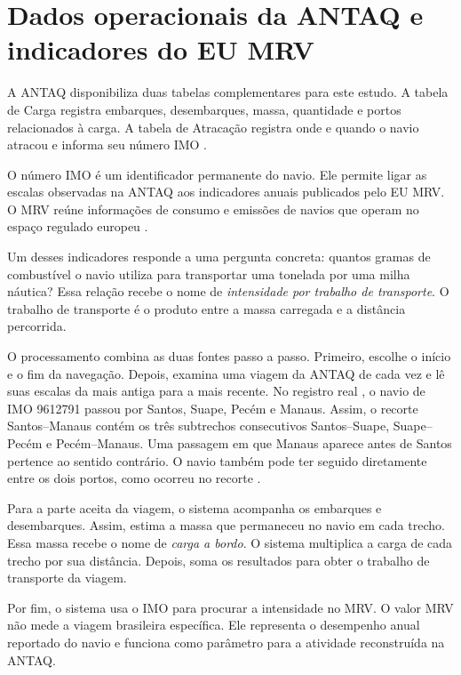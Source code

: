 \section{Dados operacionais da ANTAQ e indicadores do EU MRV}
\label{sec:antaq-mrv-literatura}

A ANTAQ disponibiliza duas tabelas complementares para este estudo. A tabela de Carga registra embarques, desembarques, massa, quantidade e portos relacionados à carga. A tabela de Atracação registra onde e quando o navio atracou e informa seu número IMO \cite{antaq2025}.

O número IMO é um identificador permanente do navio. Ele permite ligar as escalas observadas na ANTAQ aos indicadores anuais publicados pelo EU MRV. O MRV reúne informações de consumo e emissões de navios que operam no espaço regulado europeu \cite{eumrv2025}.

Um desses indicadores responde a uma pergunta concreta: quantos gramas de combustível o navio utiliza para transportar uma tonelada por uma milha náutica? Essa relação recebe o nome de \emph{intensidade por trabalho de transporte}. O trabalho de transporte é o produto entre a massa carregada e a distância percorrida.

O processamento combina as duas fontes passo a passo. Primeiro, escolhe o início e o fim da navegação. Depois, examina uma viagem da ANTAQ de cada vez e lê suas escalas da mais antiga para a mais recente. No registro real , o navio de IMO 9612791 passou por Santos, Suape, Pecém e Manaus. Assim, o recorte Santos--Manaus contém os três subtrechos consecutivos Santos--Suape, Suape--Pecém e Pecém--Manaus. Uma passagem em que Manaus aparece antes de Santos pertence ao sentido contrário. O navio também pode ter seguido diretamente entre os dois portos, como ocorreu no recorte .

Para a parte aceita da viagem, o sistema acompanha os embarques e desembarques. Assim, estima a massa que permaneceu no navio em cada trecho. Essa massa recebe o nome de \emph{carga a bordo}. O sistema multiplica a carga de cada trecho por sua distância. Depois, soma os resultados para obter o trabalho de transporte da viagem.

Por fim, o sistema usa o IMO para procurar a intensidade no MRV. O valor MRV não mede a viagem brasileira específica. Ele representa o desempenho anual reportado do navio e funciona como parâmetro para a atividade reconstruída na ANTAQ.

